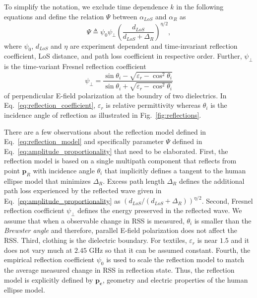 \documentclass[journal, 10pt, twocolumn, balance]{IEEEtran}
\begin{document}
To simplify the notation, we exclude time dependence $k$ in the following equations and define the relation $\Psi$ between $\alpha_{LoS}$ and $\alpha_{R}$ as
\begin{equation}\label{eq:amplitude_proportionality}
	\Psi \triangleq  \psi_{0} \psi_{\bot} \left(\frac{d_{LoS}}{d_{LoS} + \Delta_R}\right)^{\eta/2},
\end{equation}
where $\psi_{0}$, $d_{LoS}$ and $\eta$ are experiment dependent and time-invariant reflection coefficient, LoS distance, and path loss coefficient in respective order. Further, $\psi_{\bot}$ is the time-variant Fresnel reflection coefficient \cite[pp. 114-125]{rappaport1996}
\begin{equation}\label{eq:reflection_coefficient}
\psi_{\bot} = \frac{\sin \theta_i- \sqrt{\varepsilon_r - \cos^2\theta_i}}{\sin \theta_i + \sqrt{\varepsilon_r - \cos^2\theta_i}}
\end{equation}
of perpendicular E-field polarization at the boundry of two dielectrics. In Eq.~\eqref{eq:reflection_coefficient}, $\varepsilon_r$ is relative permittivity whereas $\theta_i$ is the incidence angle of reflection as illustrated in Fig.~\ref{fig:reflections}. 


There are a few observations about the reflection model defined in Eq.~\eqref{eq:reflection_model} and specifically parameter $\Psi$ defined in Eq.~\eqref{eq:amplitude_proportionality} that need to be elaborated. First, the reflection model is based on a single multipath component that reflects from point $\boldsymbol{p}_R$ with incidence angle $\theta_i$ that implicitly defines a tangent to the human ellipse model that minimizes $\Delta_R$. Excess path length $\Delta_R$ defines the additional path loss experienced by the reflected wave given in Eq.~\eqref{eq:amplitude_proportionality} as $\left(d_{LoS}/(d_{LoS} + \Delta_R)\right)^{\eta/2}$. Second, Fresnel reflection coefficient $\psi_{\bot}$ defines the energy preserved in the reflected wave. We assume that when a observable change in RSS is measured, $\theta_i$ is smaller than the \emph{Brewster angle} and therefore, parallel E-field polarization does not affect the RSS. Third, clothing is the dielectric boundary. For textiles, $\varepsilon_r$ is near $1.5$ and it does not vary much at $2.45 \text{ GHz}$ \cite{Sankaralingam2010} so that it can be assumed constant. Fourth, the empirical reflection coefficient $\psi_{0}$ is used to scale the reflection model to match the average measured change in RSS in reflection state. Thus, the reflection model is explicitly defined by $\boldsymbol{p_c}$, geometry and electric properties of the human ellipse model. 
\end{document}
